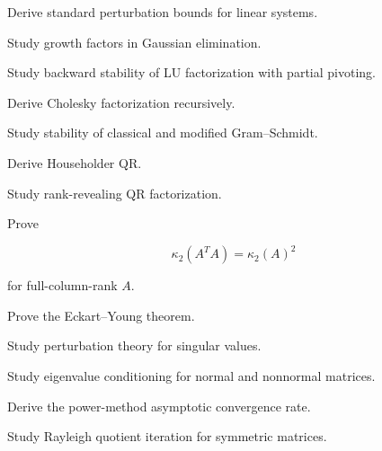 \begin{exercise}[4]
Derive standard perturbation bounds for linear systems.
\end{exercise}

\begin{exercise}[4]
Study growth factors in Gaussian elimination.
\end{exercise}

\begin{exercise}[4]
Study backward stability of LU factorization with partial pivoting.
\end{exercise}

\begin{exercise}[4]
Derive Cholesky factorization recursively.
\end{exercise}

\begin{exercise}[4]
Study stability of classical and modified Gram--Schmidt.
\end{exercise}

\begin{exercise}[4]
Derive Householder QR.
\end{exercise}

\begin{exercise}[4]
Study rank-revealing QR factorization.
\end{exercise}

\begin{exercise}[4]
Prove

\[
\kappa_2(A^TA)
=
\kappa_2(A)^2
\]

for full-column-rank \(A\).
\end{exercise}

\begin{exercise}[4]
Prove the Eckart--Young theorem.
\end{exercise}

\begin{exercise}[4]
Study perturbation theory for singular values.
\end{exercise}

\begin{exercise}[4]
Study eigenvalue conditioning for normal and nonnormal matrices.
\end{exercise}

\begin{exercise}[4]
Derive the power-method asymptotic convergence rate.
\end{exercise}

\begin{exercise}[4]
Study Rayleigh quotient iteration for symmetric matrices.
\end{exercise}

